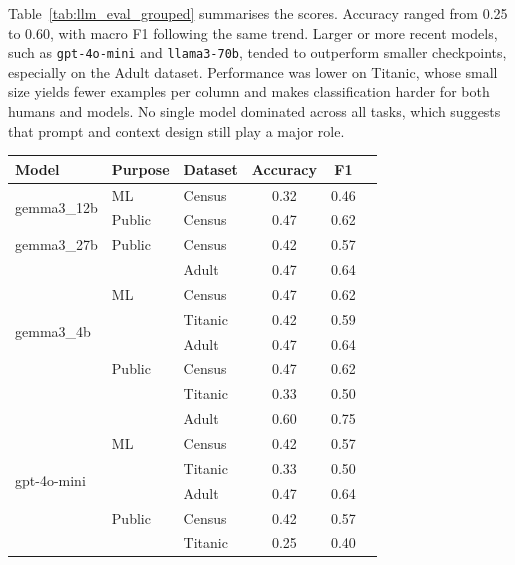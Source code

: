\documentclass{article}
\begin{document}
Table~\ref{tab:llm_eval_grouped} summarises the scores.  
Accuracy ranged from 0.25 to 0.60, with macro F1 following the same trend.  
Larger or more recent models, such as \texttt{gpt-4o-mini} and \texttt{llama3-70b}, tended to outperform smaller checkpoints, especially on the Adult dataset.  
Performance was lower on Titanic, whose small size yields fewer examples per column and makes classification harder for both humans and models.  
No single model dominated across all tasks, which suggests that prompt and context design still play a major role.

\begin{table}[h]
\centering
\small
\begin{tabular}{lllccl}
\toprule
\textbf{Model} & \textbf{Purpose} & \textbf{Dataset} & \textbf{Accuracy} & \textbf{F1} \\
\midrule
\multirow{2}{*}{gemma3\_12b} & ML & Census & 0.32 & 0.46 \\
                             & Public & Census & 0.47 & 0.62 \\
\midrule
gemma3\_27b & Public & Census & 0.42 & 0.57 \\
\midrule
\multirow{6}{*}{gemma3\_4b} & \multirow{3}{*}{ML} & Adult & 0.47 & 0.64 \\
                            &                     & Census & 0.47 & 0.62 \\
                            &                     & Titanic & 0.42 & 0.59 \\
                            & \multirow{3}{*}{Public} & Adult & 0.47 & 0.64 \\
                            &                          & Census & 0.47 & 0.62 \\
                            &                          & Titanic & 0.33 & 0.50 \\
\midrule
\multirow{6}{*}{gpt-4o-mini} & \multirow{3}{*}{ML} & Adult & 0.60 & 0.75 \\
                             &                     & Census & 0.42 & 0.57 \\
                             &                     & Titanic & 0.33 & 0.50 \\
                             & \multirow{3}{*}{Public} & Adult & 0.47 & 0.64 \\
                             &                          & Census & 0.42 & 0.57 \\
                             &                          & Titanic & 0.25 & 0.40 \\

\end{tabular}
\end{table}
\end{document}
